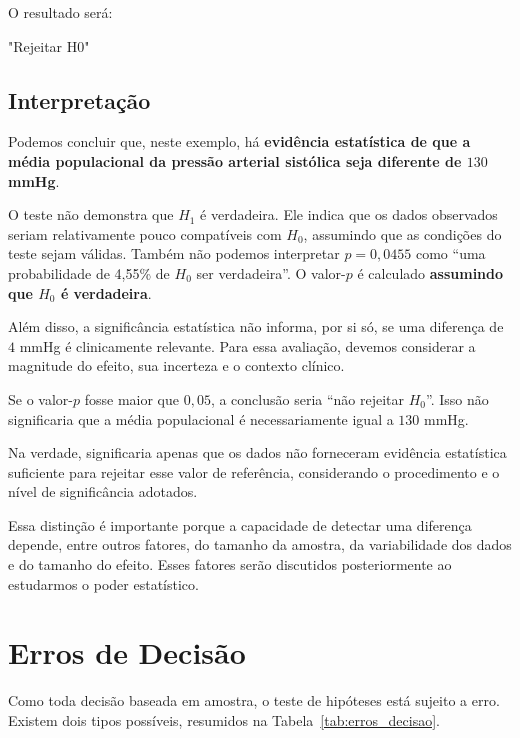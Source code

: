 O resultado será:

\begin{code} "Rejeitar H0"
\end{code}

\subsection{Interpretação}

Podemos concluir que, neste exemplo, há \textbf{evidência estatística de que a
média populacional da pressão arterial sistólica seja diferente de
$130$ mmHg}.

O teste não demonstra que $H_1$ é verdadeira. Ele indica que os dados observados
seriam relativamente pouco compatíveis com $H_0$, assumindo que as condições
do teste sejam válidas. Também não podemos interpretar $p=0{,}0455$ como ``uma probabilidade de
4,55\% de $H_0$ ser verdadeira''. O valor-$p$ é calculado \textbf{assumindo
que $H_0$ é verdadeira}.

Além disso, a significância estatística não informa, por si só, se uma
diferença de $4$ mmHg é clinicamente relevante. Para essa avaliação, devemos
considerar a magnitude do efeito, sua incerteza e o contexto clínico.

\begin{error}

Se o valor-$p$ fosse maior que $0{,}05$, a conclusão seria ``não rejeitar
$H_0$''. Isso não significaria que a média populacional é necessariamente
igual a $130$ mmHg.

Na verdade, significaria apenas que os dados não forneceram evidência estatística
suficiente para rejeitar esse valor de referência, considerando o procedimento
e o nível de significância adotados.

Essa distinção é importante porque a capacidade de detectar uma diferença
depende, entre outros fatores, do tamanho da amostra, da variabilidade dos
dados e do tamanho do efeito. Esses fatores serão discutidos posteriormente
ao estudarmos o poder estatístico.
\end{error}

\section{Erros de Decisão}
Como toda decisão baseada em amostra, o teste de hipóteses está sujeito a erro. Existem dois tipos possíveis, resumidos na Tabela~\ref{tab:erros_decisao}.

